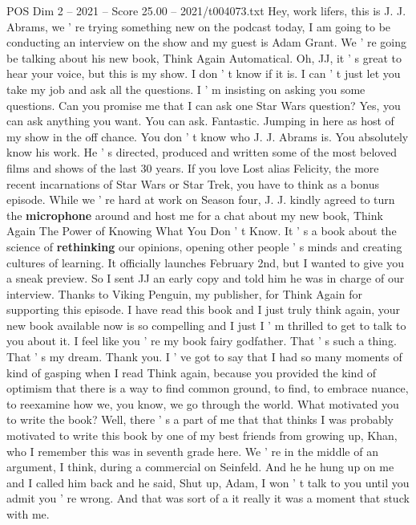 \begin{textsample}{POS Dim 2 – 2021 – Score 25.00 – 2021/t004073.txt}  \label{ex:f2_pos_029}
Hey, work lifers, this is J.
J.
Abrams, we ' re trying something new on the podcast today, I am going to be conducting an interview on the show and my guest is Adam Grant.
We ' re going be talking about his new book, Think Again Automatical.
Oh, JJ, it ' s great to hear your voice, but this is my show.
I don ' t know if it is.
I can ' t just let you take my job and ask all the questions.
I ' m insisting on asking you some questions.
Can you promise me that I can ask one Star Wars question?
Yes, you can ask anything you want.
You can ask.
Fantastic.
Jumping in here as host of my show in the off chance.
You don ' t know who J.
J.
Abrams is.
You absolutely know his work.
He ' s directed, produced and written some of the most beloved films and shows of the last 30 years.
If you love Lost alias Felicity, the more recent incarnations of Star Wars or Star Trek, you have to think as a bonus episode.
While we ' re hard at work on Season four, J.
J. kindly agreed to turn the \textbf{microphone} around and host me for a chat about my new book, Think Again The Power of Knowing What You Don ' t Know.
It ' s a book about the science of \textbf{rethinking} our opinions, opening other people ' s minds and creating cultures of learning.
It officially launches February 2nd, but I wanted to give you a sneak preview.
So I sent JJ an early copy and told him he was in charge of our interview.
Thanks to Viking Penguin, my publisher, for Think Again for supporting this episode.
I have read this book and I just truly think again, your new book available now is so compelling and I just I ' m thrilled to get to talk to you about it.
I feel like you ' re my book fairy godfather.
That ' s such a thing.
That ' s my dream.
Thank you.
I ' ve got to say that I had so many moments of kind of gasping when I read Think again, because you provided the kind of optimism that there is a way to find common ground, to find, to embrace nuance, to reexamine how we, you know, we go through the world.
What motivated you to write the book?
Well, there ' s a part of me that that thinks I was probably motivated to write this book by one of my best friends from growing up, Khan, who I remember this was in seventh grade here.
We ' re in the middle of an argument, I think, during a commercial on Seinfeld.
And he he hung up on me and I called him back and he said, Shut up, Adam, I won ' t talk to you until you admit you ' re wrong.
And that was sort of a it really it was a moment that stuck with me.

\end{textsample}
